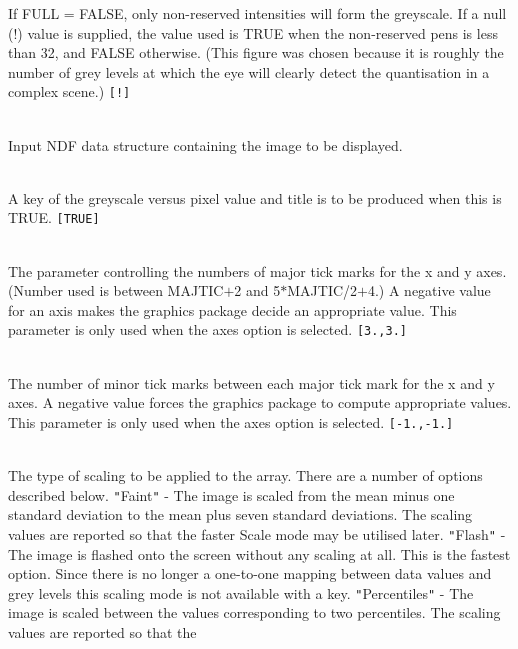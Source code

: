 \documentclass[twoside,11pt]{article}
\newcommand{\sstsubsection}[1]{ \item[{#1}] \mbox{} \\}
\newcommand{\sstsubsection}[1]{\item[{#1}]}
\begin{document}
{{{         If FULL = FALSE, only non-reserved intensities will form the
         greyscale.  If a null (!) value is supplied, the value used is
         TRUE when the non-reserved pens is less than 32, and FALSE
         otherwise.  (This figure was chosen because it is roughly the
         number of grey levels at which the eye will clearly detect the
         quantisation in a complex scene.) {\tt [!]}
      }
      \sstsubsection{
         IN = NDF (Read)
      }{
         Input NDF data structure containing the image to be displayed.
      }
      \sstsubsection{
         KEY = \_LOGICAL (Read)
      }{
         A key of the greyscale versus pixel value and title is to be
         produced when this is TRUE. {\tt [TRUE]}
      }
      \sstsubsection{
         MAJTIC( 2 ) = \_REAL (Read)
      }{
         The parameter controlling the numbers of major tick marks
         for the x and y axes.  (Number used is between MAJTIC$+$2 and
         5$*$MAJTIC/2$+$4.)   A negative value for an axis makes the
         graphics package decide an appropriate value.  This parameter
         is only used when the axes option is selected. {\tt [3.,3.]}
      }
      \sstsubsection{
         MINTIC( 2 ) = \_REAL (Read)
      }{
         The number of minor tick marks between each major tick mark
         for the x and y axes.  A negative value forces the graphics
         package to compute appropriate values.   This parameter is
         only used when the axes option is selected. {\tt [-1.,-1.]}
      }
      \sstsubsection{
         MODE = LITERAL (Read)
      }{
         The type of scaling to be applied to the array.  There are a
         number of options described below.
           {\tt "}Faint{\tt "}       - The image is scaled from the mean minus one
                           standard deviation to the mean plus seven
                           standard deviations.  The scaling values are
                           reported so that the faster Scale mode may be
                           utilised later.
           {\tt "}Flash{\tt "}       - The image is flashed onto the screen without
                           any scaling at all.  This is the fastest
                           option.  Since there is no longer a
                           one-to-one mapping between data values and
                           grey levels this scaling mode is not
                           available with a key.
           {\tt "}Percentiles{\tt "} - The image is scaled between the values
                           corresponding to two percentiles.  The
                           scaling values are reported so that the
}}}
\end{document}
